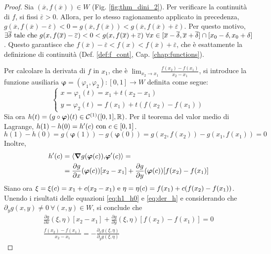 \begin{proof}
    Sia $(\overline{x},f(\overline{x}))\in W$ (Fig. \ref{fig:thm_dini_2}). Per verificare la continuità di $f$, si fissi $\overline{\varepsilon}>0$. Allora, per lo stesso ragionamento applicato in precedenza, $g(\overline{x},f(\overline{x})-\overline{\varepsilon})<0=g(\overline{x},f(\overline{x}))<g(\overline{x}, f(\overline{x})+\overline{\varepsilon})$. Per questo motivo, $\exists \overline{\delta} \text{ tale che } g(x,f(\overline{x})-\overline{\varepsilon}) < 0 < g(x,f(\overline{x})+\overline{\varepsilon}) \ \forall x \in [\overline{x}-\overline{\delta},\overline{x}+\overline{\delta}]\cap[x_0-\delta,x_0+\delta]$. Questo garantisce che $f(\overline{x})-\overline{\varepsilon} < f(x) < f(\overline{x})+\overline{\varepsilon}$, che è esattamente la definizione di continuità (Def. \ref{def:f_cont}, Cap. \ref{chap:functions}).


    Per calcolare la derivata di $f$ in $x_1$, che è $\displaystyle\lim_{x_2\to x_1}\frac{f(x_2)-f(x_1)}{x_2-x_1}$, si introduce la funzione ausiliaria $\bm \varphi=(\varphi_1,\varphi_2):[0,1]\to W$ definita come segue:
    $$
        \begin{cases}
            x=\varphi_1(t)=x_1+t(x_2-x_1)\\
            y=\varphi_2(t)=f(x_1)+t(f(x_2)-f(x_1))
        \end{cases}
    $$
    Sia ora $h(t)=(g\circ\bm\varphi)(t) \in \mathcal{C}^{(1)}([0,1],\mathbb{R})$. Per il teorema del valor medio di Lagrange, $h(1)-h(0)=h'(c) \text{ con } c \in [0,1]$.
    \begin{equation}
        h(1)-h(0)=g(\bm\varphi(1))-g(\bm\varphi(0))=g(x_2,f(x_2))-g(x_1,f(x_1))=0\label{eq:h1_h0}
    \end{equation}
    Inoltre,
    \begin{align}
        h'(c)
        &=\left\langle\grad g(\bm\varphi(c)){,}\bm\varphi'(c)\right\rangle=\notag\\
        &=\frac{\partial g}{\partial x}(\bm\varphi(c))[x_2-x_1]+\frac{\partial g}{\partial y}(\bm\varphi(c))[f(x_2)-f(x_1)]\label{eq:der_h}
    \end{align}
    Siano ora $\xi=\xi(c)=x_1+c(x_2-x_1) \text{ e } \eta=\eta(c)=f(x_1)+c(f(x_2)-f(x_1))$. Unendo i risultati delle equazioni \eqref{eq:h1_h0} e \eqref{eq:der_h} e considerando che $\partial_yg(x,y)\neq 0 \ \forall (x,y) \in W$, si conclude che
    \begin{gather*}
        \frac{\partial g}{\partial x}(\xi,\eta)[x_2-x_1]+\frac{\partial g}{\partial y}(\xi,\eta)[f(x_2)-f(x_1)]=0\\
        \frac{f(x_2)-f(x_1)}{x_2-x_1}=-\frac{\partial_x g(\xi,\eta)}{\partial_y g(\xi,\eta)}

\end{gather*}
\end{proof}
